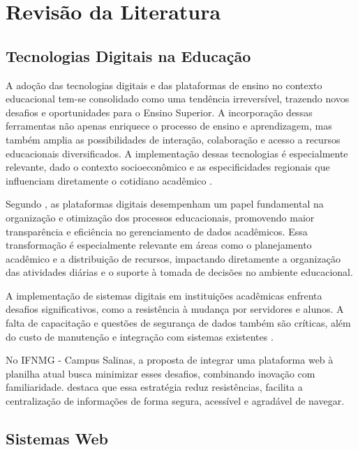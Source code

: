\chapter{Revisão da Literatura} 
\label{cap3_revisao} 

\section{Tecnologias Digitais na Educação}

A adoção das tecnologias digitais e das plataformas de ensino no contexto educacional tem-se consolidado como uma tendência irreversível, trazendo novos desafios e oportunidades para o Ensino Superior. A incorporação dessas ferramentas não apenas enriquece o processo de ensino e aprendizagem, mas também amplia as possibilidades de interação, colaboração e acesso a recursos educacionais diversificados. A implementação dessas tecnologias é especialmente relevante, dado o contexto socioeconômico e as especificidades regionais que influenciam diretamente o cotidiano acadêmico \cite{Ferreira_Lopes_Oliveira_Carvalho_Souza_Santos_Silva_Veloso_2024}.

Segundo , as plataformas digitais desempenham um papel fundamental na organização e otimização dos processos educacionais, promovendo maior transparência e eficiência no gerenciamento de dados acadêmicos. Essa transformação é especialmente relevante em áreas como o planejamento acadêmico e a distribuição de recursos, impactando diretamente a organização das atividades diárias e o suporte à tomada de decisões no ambiente educacional.

A implementação de sistemas digitais em instituições acadêmicas enfrenta desafios
significativos, como a resistência à mudança por servidores e alunos. A falta de capacitação e questões de segurança de dados também são críticas, além do custo de manutenção e integração com sistemas existentes \cite{senger2022gestao}. 

No IFNMG - Campus Salinas, a proposta de integrar uma plataforma web à planilha atual busca minimizar esses desafios, combinando inovação com familiaridade.  destaca que essa estratégia reduz resistências, facilita a centralização de informações de forma segura, acessível e agradável de navegar.

\section{Sistemas Web}

